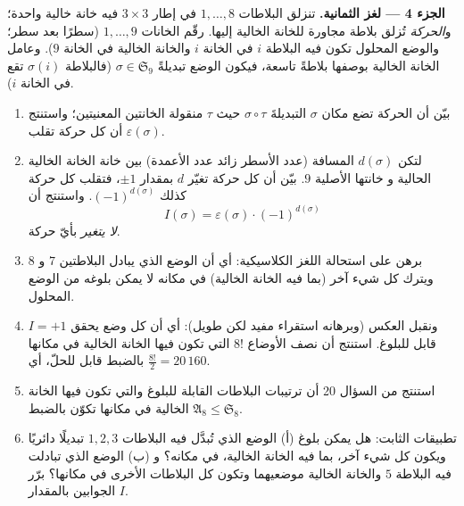 \begin{problem}
\medskip
\noindent\textbf{الجزء 4 --- لغز الثمانية.} تنزلق البلاطات $1, \dots, 8$
في إطار $3 \times 3$ فيه خانة خالية واحدة؛ و\emph{الحركة}
تُزلق بلاطة مجاورة للخانة الخالية إليها. رقّم الخانات
$1, \dots, 9$ (سطرًا بعد سطر؛ والوضع المحلول تكون فيه البلاطة $i$ في
الخانة $i$ والخانة الخالية في الخانة $9$). وعامل الخانة الخالية بوصفها
بلاطةً تاسعة، فيكون الوضع تبديلةً $\sigma \in \mathfrak
S_9$ (فالبلاطة $\sigma(i)$ تقع في الخانة $i$).
\begin{enumerate}[resume]
  \item بيّن أن الحركة تضع مكان $\sigma$ التبديلةَ $\sigma \circ \tau$
        حيث $\tau$ منقولة الخانتين المعنيتين؛ واستنتج أن كل حركة تقلب
        $\varepsilon(\sigma)$.
  \item لتكن $d(\sigma)$ المسافة (عدد الأسطر زائد عدد
        الأعمدة) بين خانة الخانة الخالية الحالية و
        خانتها الأصلية $9$. بيّن أن كل حركة تغيّر $d$ بمقدار $\pm1$،
        فتقلب كل حركة كذلك $(-1)^{d(\sigma)}$. واستنتج أن
        \[
        I(\sigma) = \varepsilon(\sigma)\cdot(-1)^{d(\sigma)}
        \]
        \emph{لا يتغير} بأيّ حركة.
  \item برهن على استحالة اللغز الكلاسيكية: أي أن الوضع
        الذي يبادل البلاطتين $7$ و $8$ ويترك كل شيء آخر
        (بما فيه الخانة الخالية) في مكانه لا يمكن بلوغه
        من الوضع المحلول.
  \item ونقبل العكس (وبرهانه استقراء مفيد لكن
        طويل): أي أن كل وضع يحقق $I = +1$ قابل للبلوغ. استنتج
        أن نصف الأوضاع $8!$ التي تكون فيها الخانة الخالية في
        مكانها بالضبط قابل للحلّ، أي
        $\frac{8!}2 = 20\,160$.
  \item استنتج من السؤال 20 أن ترتيبات البلاطات
        القابلة للبلوغ والتي تكون فيها الخانة الخالية في مكانها تكوّن بالضبط
         $\mathfrak A_8 \leq \mathfrak S_8$.
  \item تطبيقات الثابت: هل يمكن بلوغ (أ)
        الوضع الذي تُبدَّل فيه البلاطات $1, 2, 3$ تبديلًا دائريًا
        ويكون كل شيء آخر، بما فيه الخانة الخالية، في مكانه؟
        و (ب) الوضع الذي تبادلت فيه البلاطة $5$ والخانة الخالية
        موضعيهما وتكون كل البلاطات الأخرى في مكانها؟ برّر
        الجوابين بالمقدار $I$.
\end{enumerate}


\end{problem}
